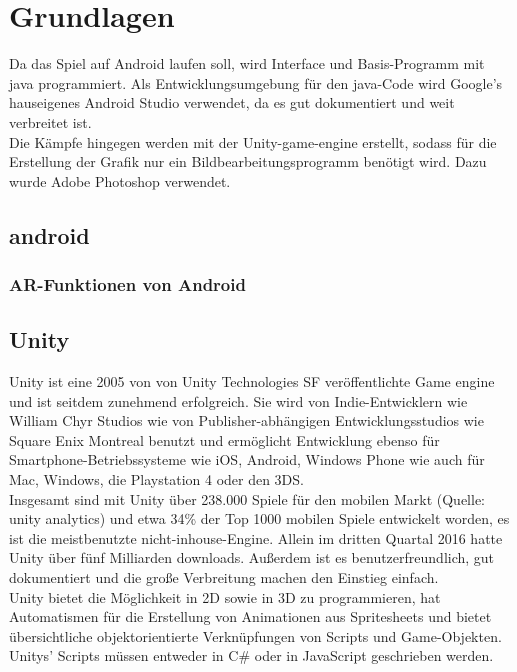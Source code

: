 \documentclass[extern,palatino]{cgBA}
\begin{document}
\section{Grundlagen}
Da das Spiel auf Android laufen soll, wird Interface und Basis-Programm mit java programmiert. Als Entwicklungsumgebung für den java-Code wird Google's hauseigenes Android Studio verwendet, da es gut dokumentiert und weit verbreitet ist.
\\Die Kämpfe hingegen werden mit der Unity-game-engine erstellt, sodass für die Erstellung der Grafik nur ein Bildbearbeitungsprogramm benötigt wird. Dazu wurde Adobe Photoshop verwendet.
\subsection{android}
\subsubsection{AR-Funktionen von Android}
\newpage
\subsection{Unity}
Unity ist eine 2005 von von Unity Technologies SF veröffentlichte Game engine und ist seitdem zunehmend erfolgreich. %
Sie wird von Indie-Entwicklern wie William Chyr Studios wie von Publisher-abhängigen Entwicklungsstudios wie Square Enix Montreal benutzt und ermöglicht Entwicklung ebenso für Smartphone-Betriebssysteme wie iOS, Android, Windows Phone wie auch für Mac, Windows, die Playstation 4 oder den 3DS. 
\\Insgesamt sind mit Unity über 238.000 Spiele für den mobilen Markt (Quelle: unity analytics) und etwa 34\% der Top 1000 mobilen Spiele entwickelt worden, es ist die meistbenutzte nicht-inhouse-Engine. Allein im dritten Quartal 2016 hatte Unity über fünf Milliarden downloads. Außerdem ist es benutzerfreundlich, gut dokumentiert und die große Verbreitung machen den Einstieg einfach.
\\Unity bietet die Möglichkeit in 2D sowie in 3D zu programmieren, hat Automatismen für die Erstellung von Animationen aus Spritesheets und bietet übersichtliche objektorientierte Verknüpfungen von Scripts und Game-Objekten. Unitys' Scripts müssen entweder in C\# oder in JavaScript geschrieben werden.
\newpage
\end{document}
